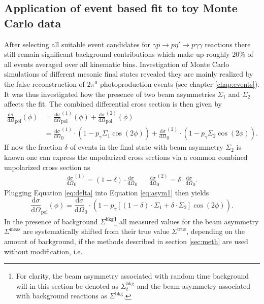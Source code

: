 \subsection{Application of event based fit to toy Monte Carlo data}
After selecting all suitable event candidates for $\gamma p \to p \eta'\to p\gamma\gamma$ reactions there still remain significant background contributions which make up roughly $20\%$ of all events averaged over all kinematic bins. Investigation of Monte Carlo simulations of different mesonic final states revealed they are mainly realized by the false reconstruction of $2\pi^0$ photoproduction events (see chapter \ref{chap:events}). It was thus investigated how the presence of two beam asymmetries $\Sigma_1$ and $\Sigma_2$ affects the fit. The combined differential cross section is then given by \begin{align}
	\frac{\text{d}\sigma}{\text{d}\Omega}_\text{pol}\left(\phi\right)&=\frac{\text{d}\sigma}{\text{d}\Omega}_\text{pol}^{(1)}\left(\phi\right)+\frac{\text{d}\sigma}{\text{d}\Omega}_\text{pol}^{(2)}\left(\phi\right)\\&=\frac{\text{d}\sigma}{\text{d}\Omega}_0^{(1)}\cdot\left(1-p_\gamma\Sigma_1\cos\left(2\phi\right)\right)+\frac{\text{d}\sigma}{\text{d}\Omega}_0^{(2)}\cdot\left(1-p_\gamma\Sigma_2\cos\left(2\phi\right)\right).
	\label{eq:asym1}
\end{align}
If now the fraction $\delta$ of events in the final state with beam asymmetry $\Sigma_2$ is known one can express the unpolarized cross sections via a common combined unpolarized cross section as
\begin{align}
	\frac{\text{d}\sigma}{\text{d}\Omega}_0^{(1)}=\left(1-\delta\right)\cdot\frac{\text{d}\sigma}{\text{d}\Omega}_0&&\frac{\text{d}\sigma}{\text{d}\Omega}_0^{(2)}=\delta\cdot\frac{\text{d}\sigma}{\text{d}\Omega}_0.
	\label{eq:delta}
\end{align}
Plugging Equation \eqref{eq:delta} into Equation \eqref{eq:asym1} then yields
\begin{equation}
	\frac{\text{d}\sigma}{\text{d}\Omega}_\text{pol}\left(\phi\right)=\frac{\text{d}\sigma}{\text{d}\Omega}_0\cdot\left(1-p_\gamma\left[\left(1-\delta\right)\cdot\Sigma_1+\delta\cdot\Sigma_2\right]\cos\left(2\phi\right)\right).
\end{equation}
In the presence of background $\Sigma^\text{bkg}$\footnote{For clarity, the beam asymmetry associated with random time background will in this section be denoted as $\Sigma^\text{bkg}_t$ and the beam asymmetry associated with background reactions as $\Sigma^\text{bkg}$.} all measured values for the beam asymmetry $\Sigma^\text{meas}$ are systematically shifted from their true value $\Sigma^\text{true}$, depending on the amount of background, if the methods described in section \ref{sec:meth} are used without modification, i.e.
